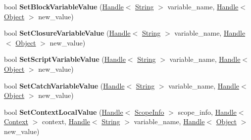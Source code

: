 \begin{DoxyCompactItemize}
\item 
bool {\bfseries Set\+Block\+Variable\+Value} (\hyperlink{classv8_1_1internal_1_1_handle}{Handle}$<$ \hyperlink{classv8_1_1internal_1_1_string}{String} $>$ variable\+\_\+name, \hyperlink{classv8_1_1internal_1_1_handle}{Handle}$<$ \hyperlink{classv8_1_1internal_1_1_object}{Object} $>$ new\+\_\+value)\hypertarget{classv8_1_1internal_1_1_scope_iterator_a7bf477e10f882a902005d824b388c6c7}{}\label{classv8_1_1internal_1_1_scope_iterator_a7bf477e10f882a902005d824b388c6c7}

\item 
bool {\bfseries Set\+Closure\+Variable\+Value} (\hyperlink{classv8_1_1internal_1_1_handle}{Handle}$<$ \hyperlink{classv8_1_1internal_1_1_string}{String} $>$ variable\+\_\+name, \hyperlink{classv8_1_1internal_1_1_handle}{Handle}$<$ \hyperlink{classv8_1_1internal_1_1_object}{Object} $>$ new\+\_\+value)\hypertarget{classv8_1_1internal_1_1_scope_iterator_a37a27a86f8493c85419b03bf22718109}{}\label{classv8_1_1internal_1_1_scope_iterator_a37a27a86f8493c85419b03bf22718109}

\item 
bool {\bfseries Set\+Script\+Variable\+Value} (\hyperlink{classv8_1_1internal_1_1_handle}{Handle}$<$ \hyperlink{classv8_1_1internal_1_1_string}{String} $>$ variable\+\_\+name, \hyperlink{classv8_1_1internal_1_1_handle}{Handle}$<$ \hyperlink{classv8_1_1internal_1_1_object}{Object} $>$ new\+\_\+value)\hypertarget{classv8_1_1internal_1_1_scope_iterator_aa39aea9a95ee51b53152eda1ea2d8df0}{}\label{classv8_1_1internal_1_1_scope_iterator_aa39aea9a95ee51b53152eda1ea2d8df0}

\item 
bool {\bfseries Set\+Catch\+Variable\+Value} (\hyperlink{classv8_1_1internal_1_1_handle}{Handle}$<$ \hyperlink{classv8_1_1internal_1_1_string}{String} $>$ variable\+\_\+name, \hyperlink{classv8_1_1internal_1_1_handle}{Handle}$<$ \hyperlink{classv8_1_1internal_1_1_object}{Object} $>$ new\+\_\+value)\hypertarget{classv8_1_1internal_1_1_scope_iterator_a58aa53d1c137db80c0b0caf19bc38dd2}{}\label{classv8_1_1internal_1_1_scope_iterator_a58aa53d1c137db80c0b0caf19bc38dd2}

\item 
bool {\bfseries Set\+Context\+Local\+Value} (\hyperlink{classv8_1_1internal_1_1_handle}{Handle}$<$ \hyperlink{classv8_1_1internal_1_1_scope_info}{Scope\+Info} $>$ scope\+\_\+info, \hyperlink{classv8_1_1internal_1_1_handle}{Handle}$<$ \hyperlink{classv8_1_1internal_1_1_context}{Context} $>$ context, \hyperlink{classv8_1_1internal_1_1_handle}{Handle}$<$ \hyperlink{classv8_1_1internal_1_1_string}{String} $>$ variable\+\_\+name, \hyperlink{classv8_1_1internal_1_1_handle}{Handle}$<$ \hyperlink{classv8_1_1internal_1_1_object}{Object} $>$ new\+\_\+value)\hypertarget{classv8_1_1internal_1_1_scope_iterator_a776656e9101858598d5b019cd8ded76d}{}\label{classv8_1_1internal_1_1_scope_iterator_a776656e9101858598d5b019cd8ded76d}


\end{DoxyCompactItemize}
